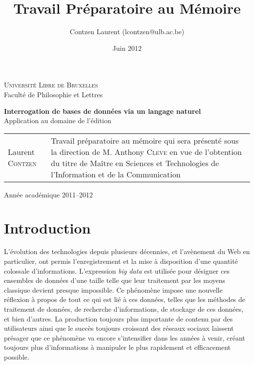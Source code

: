 \documentclass[a4paper,12pt]{article}
\title{Travail Préparatoire au Mémoire}
\date{Juin 2012}
\author{Contzen Laurent (lcontzen@ulb.ac.be)}
\begin{document}
\begin{titlepage}
  \singlespacing
  \begin{center}
    \huge{\textsc{Université Libre de Bruxelles}}\\
    \huge{Faculté de Philosophie et Lettres}
  \end{center}
  \vfill
  \begin{center}
    \Huge{\textbf{Interrogation de bases de données via un langage naturel}}\\
    \LARGE{Application au domaine de l'édition}
  \end{center}
  \vfill
  \begin{tabular}{b{5.5cm}b{7.5cm}}
    Laurent \textsc{Contzen} & Travail préparatoire au mémoire qui sera présenté sous la direction de M. Anthony \textsc{Cleve} en vue de l'obtention du titre de Maître en Sciences et Technologies de \mbox{l'Information} et de la Communication\\
  \end{tabular}
  \vfill
  \begin{center}
    Année académique 2011--2012
  \end{center}
\end{titlepage}

\tableofcontents
\newpage

\section{Introduction}
L'évolution des technologies depuis plusieurs décennies, et l'avènement du Web en particulier, ont permis l'enregistrement et la mise à disposition d'une quantité colossale d'informations.
L'expression \textit{big data} est utilisée pour désigner ces ensembles de données d'une taille telle que leur traitement par les moyens classique devient presque impossible.
Ce phénomène impose une nouvelle réflexion à propos de tout ce qui est lié à ces données, telles que les méthodes de traitement de données, de recherche d'informations, de stockage de ces données, et bien d'autres.
La production toujours plus importante de contenu par des utilisateurs ainsi que le succès toujours croissant des réseaux sociaux laissent présager que ce phénomène va encore s'intensifier dans les années à venir, créant toujours plus d'informations à manipuler le plus rapidement et efficacement possible.\\
\end{document}
